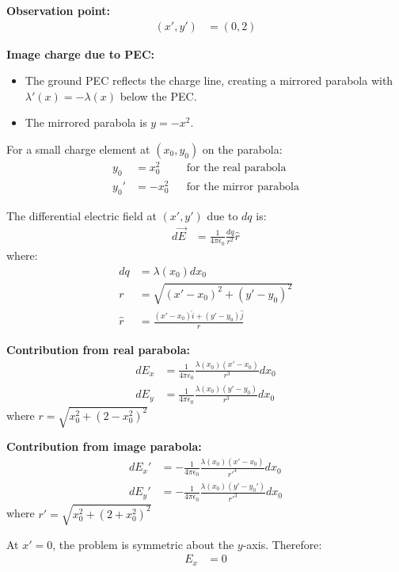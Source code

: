 \documentclass[14pt]{article}
\begin{document}
\noindent\textbf{Observation point:}
\begin{align}
    (x', y') &= (0, 2)
\end{align}

\noindent\textbf{Image charge due to PEC:}
\begin{itemize}
    \item The ground PEC reflects the charge line, creating a mirrored parabola with $\lambda'(x) = -\lambda(x)$ below the PEC.
    \item The mirrored parabola is $y = -x^2$.
\end{itemize}

For a small charge element at $(x_0, y_0)$ on the parabola:
\begin{align}
    y_0 &= x_0^2 && \text{for the real parabola} \\
    y_0' &= -x_0^2 && \text{for the mirror parabola}
\end{align}

The differential electric field at $(x', y')$ due to $dq$ is:
\begin{align}
    d\vec{E} &= \frac{1}{4\pi\epsilon_0} \frac{dq}{r^2}\hat{r}
\end{align}
where:
\begin{align}
    dq &= \lambda(x_0)dx_0 \\
    r &= \sqrt{(x' - x_0)^2 + (y' - y_0)^2} \\
    \hat{r} &= \frac{(x' - x_0)\hat{i} + (y' - y_0)\hat{j}}{r}
\end{align}

\noindent\textbf{Contribution from real parabola:}
\begin{align}
    dE_x &= \frac{1}{4\pi\epsilon_0} \frac{\lambda(x_0)(x' - x_0)}{r^3}dx_0 \\
    dE_y &= \frac{1}{4\pi\epsilon_0} \frac{\lambda(x_0)(y' - y_0)}{r^3}dx_0
\end{align}
where $r = \sqrt{x_0^2 + (2 - x_0^2)^2}$

\noindent\textbf{Contribution from image parabola:}
\begin{align}
    dE_x' &= -\frac{1}{4\pi\epsilon_0} \frac{\lambda(x_0)(x' - x_0)}{r'^3}dx_0 \\
    dE_y' &= -\frac{1}{4\pi\epsilon_0} \frac{\lambda(x_0)(y' - y_0')}{r'^3}dx_0
\end{align}
where $r' = \sqrt{x_0^2 + (2 + x_0^2)^2}$

At $x' = 0$, the problem is symmetric about the $y$-axis. Therefore:
\begin{align}
    E_x &= 0
\end{align}
\end{document}

